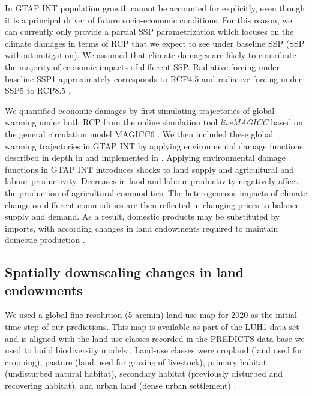 \documentclass[titlesmallcaps,copyrightpage]{uomthesis}\usepackage[]{graphicx}\usepackage[]{color}
\begin{document}
 In GTAP INT population growth cannot be accounted for explicitly, even though it is a principal driver of future socio-economic conditions. For this reason, we can currently only provide a partial SSP parametrization which focuses on the climate damages in terms of RCP that we expect to see under baseline SSP (SSP without mitigation). We assumed that climate damages are likely to contribute the majority of economic impacts of different SSP. Radiative forcing under baseline SSP1 approximately corresponds to RCP4.5 and radiative forcing under SSP5 to RCP8.5 \citep{riahi_shared_2017}.
 
 We quantified economic damages by first simulating trajectories of global warming under both RCP from the online simulation tool \textit{liveMAGICC} based on the general circulation model MAGICC6 \citep[Model for the Assessment of Greenhouse Gas Induced Climate Change][]{meinshausen_emulating_2011}. We then included these global warming trajectories in GTAP INT by applying environmental damage functions described in depth in \citet{roson_estimation_2016} and implemented in \citet{kapitza_assessing_2021}. Applying environmental damage functions in GTAP INT introduces shocks to land supply and agricultural and labour productivity. Decreases in land and labour productivity negatively affect the production of agricultural commodities. The heterogeneous impacts of climate change on different commodities are then reflected in changing prices to balance supply and demand. As a result, domestic products may be substituted by imports, with according changes in land endowments required to maintain domestic production \citep{kapitza_assessing_2021}.

\subsection{Spatially downscaling changes in land endowments}

We used a global fine-resolution (5 arcmin) land-use map for 2020 as the initial time step of our predictions. This map is available as part of the LUH1 data set \citep{hurtt_harmonization_2011} and is aligned with the land-use classes recorded in the PREDICTS data base we used to build biodiversity models \citep{hudson_predicts_2014}. Land-use classes were cropland (land used for cropping), pasture (land used for grazing of livestock), primary habitat (undisturbed natural habitat), secondary habitat (previously disturbed and recovering habitat), and urban land (dense urban settlement) \citep{hoskins_downscaling_2016}.
\end{document}
